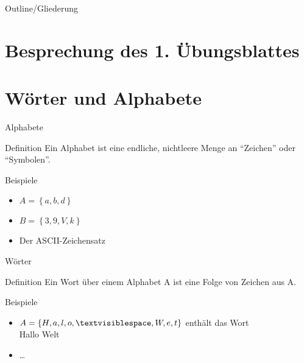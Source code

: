 
\subtitle{Foliensatz 02}
\date{1. November 2012}


\begin{frame}
    \titlepage
\end{frame}

\begin{frame}{Outline/Gliederung}
    \tableofcontents
\end{frame}

\section{Besprechung des 1. Übungsblattes}

\section{Wörter und Alphabete}
\begin{frame}{Alphabete}
    \begin{block}{Definition}
        Ein Alphabet ist eine endliche, nichtleere Menge an "`Zeichen"' oder "`Symbolen"'.
    \end{block}
    \begin{exampleblock}{Beispiele}
        \begin{itemize}
            \item $A = \left\{a, b, d\right\}$
            \item $B = \left\{3, 9, V, k\right\} $
            \item Der ASCII-Zeichensatz
        \end{itemize}
    \end{exampleblock}
\end{frame}

\begin{frame}{Wörter}
    \begin{block}{Definition}
        Ein Wort über einem Alphabet A ist eine Folge von Zeichen aus A.
    \end{block}
    \begin{exampleblock}{Beispiele}
        \begin{itemize}
            \item $A = \left\{H, a, l, o, \textvisiblespace, W, e, t\right\}$  enthält das Wort\\
            Hallo Welt
            \item \dots
        \end{itemize}
    \end{exampleblock}
\end{frame}

